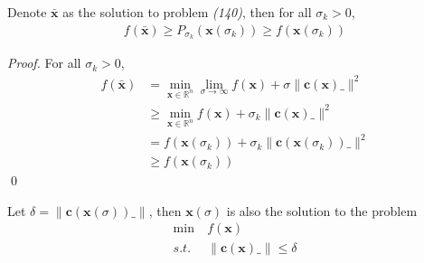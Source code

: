 \documentclass[runningheads]{llncs}
\begin{document}
\begin{lemma}
    Denote $\bar{\mathbf{x}}$ as the solution to
    problem \emph{(140)}, then for all
    $\sigma_k>0$,
    \begin{align}
        f(\bar{\mathbf{x}}) \geq
        P_{\sigma_k}(\mathbf{x}(\sigma_k))
        \geq f(\mathbf{x}(\sigma_k))
    \end{align}
\end{lemma}
\begin{proof}
    For all $\sigma_k>0$,
    \begin{align}
        f(\bar{\mathbf{x}}) &= 
        \min_{\mathbf{x} \in \mathbb{R}^n}
        \lim_{\sigma \rightarrow \infty}
        f(\mathbf{x}) + \sigma \parallel \mathbf{c}
        (\mathbf{x})\_ \parallel^2 \\
        &\geq \min_{\mathbf{x} \in \mathbb{R}^n}
        f(\mathbf{x}) + \sigma_k \parallel \mathbf{c}
        (\mathbf{x})\_ \parallel^2\\
        &= f(\mathbf{x}(\sigma_k)) + \sigma_k \parallel \mathbf{c}
        (\mathbf{x}(\sigma_{k}))\_ \parallel^2 \\
        &\geq f(\mathbf{x}(\sigma_k))
    \end{align}
    \qed
\end{proof}
\begin{lemma}
    Let $\delta = \parallel \mathbf{c}
    (\mathbf{x}(\sigma))\_ \parallel$,
    then $\mathbf{x}(\sigma)$ is also
    the solution to the problem
    \begin{align}
        \min \ &f(\mathbf{x}) \\
        s.t. \ &\parallel \mathbf{c}
        (\mathbf{x})\_ \parallel \leq \delta
    \end{align}
\end{lemma}
\end{document}
